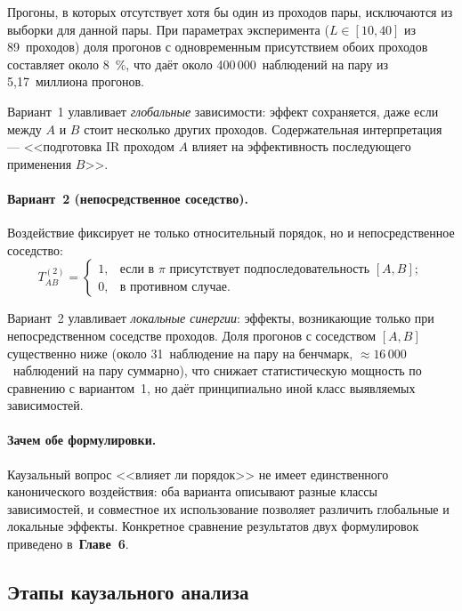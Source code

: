 Прогоны, в которых отсутствует хотя бы один из проходов пары, исключаются из выборки для данной пары. При параметрах эксперимента ($L \in [10, 40]$ из 89~проходов) доля прогонов с одновременным присутствием обоих проходов составляет около 8~\%, что даёт около 400\,000~наблюдений на пару из 5{,}17~миллиона прогонов.

Вариант~1 улавливает \emph{глобальные} зависимости: эффект сохраняется, даже если между $A$ и $B$ стоит несколько других проходов. Содержательная интерпретация --- <<подготовка IR проходом $A$ влияет на эффективность последующего применения $B$>>.

\paragraph{Вариант~2 (непосредственное соседство).} Воздействие фиксирует не только относительный порядок, но и непосредственное соседство:
\begin{equation*}
    T_{AB}^{(2)} = \begin{cases}
        1, & \text{если в } \pi \text{ присутствует подпоследовательность } [A, B]; \\
        0, & \text{в противном случае}.
    \end{cases}
\end{equation*}

Вариант~2 улавливает \emph{локальные синергии}: эффекты, возникающие только при непосредственном соседстве проходов. Доля прогонов с соседством $[A, B]$ существенно ниже (около 31~наблюдение на пару на бенчмарк, $\approx 16\,000$~наблюдений на пару суммарно), что снижает статистическую мощность по сравнению с вариантом~1, но даёт принципиально иной класс выявляемых зависимостей.

\paragraph{Зачем обе формулировки.} Каузальный вопрос <<влияет ли порядок>> не имеет единственного канонического воздействия: оба варианта описывают разные классы зависимостей, и совместное их использование позволяет различить глобальные и локальные эффекты. Конкретное сравнение результатов двух формулировок приведено в~\textbf{Главе~6}.

\subsection{Этапы каузального анализа}

